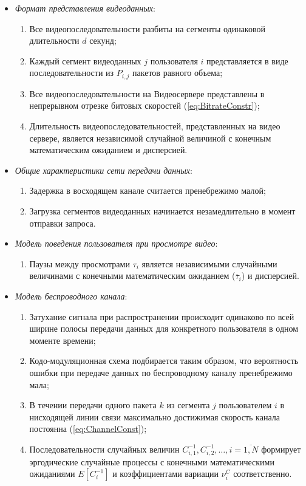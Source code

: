 \begin{itemize}
	\item \textit{Формат представления видеоданных}:
		\begin{enumerate}
			\item Все видеопоследовательности разбиты на сегменты одинаковой длительности $d$ секунд;
			\item Каждый сегмент видеоданных $j$ пользователя $i$ представляется в виде последовательности из $P_{i,j}$ пакетов равного объема;
			\item Все видеопоследовательности на Видеосервере представлены в непрерывном отрезке битовых скоростей (\ref{eq:BitrateConstr});
			\item Длительность видеопоследовательностей, представленных на видео сервере, является независимой случайной величиной с конечным математическим ожиданием и дисперсией.
		\end{enumerate}
	\item \textit{Общие характеристики сети передачи данных}:
		\begin{enumerate}
			\item Задержка в восходящем канале считается пренебрежимо малой;
			\item Загрузка сегментов видеоданных начинается незамедлительно в момент отправки запроса.
		\end{enumerate}
	\item \textit{Модель поведения пользователя при просмотре видео}:
		\begin{enumerate}
			\item Паузы между просмотрами $\tau_i$ является независимыми случайными величинами с конечными математическим ожиданием ($\overline{\tau}_i$) и дисперсией.
		\end{enumerate}
	\item \textit{Модель беспроводного канала}:
		\begin{enumerate}
			\item Затухание сигнала при распространении происходит одинаково по всей ширине полосы передачи данных для конкретного пользователя в одном моменте времени;
			\item Кодо-модуляционная схема подбирается таким образом, что вероятность ошибки при передаче данных по беспроводному каналу пренебрежимо мала;
			\item В течении передачи одного пакета $k$ из сегмента $j$ пользователем $i$ в нисходящей линии связи максимально достижимая скорость канала постоянна (\ref{eq:ChannelConst});
			\item Последовательности случайных величин $C^{-1}_{i,1}, C^{-1}_{i,2}, \ldots, i=\overline{1,N}$  формирует эргодические случайные процессы с конечными математическими ожиданиями $E[C_i^{-1}]$ и коэффициентами вариации $\nu^{C}_i$ соответственно.

\end{enumerate}
\end{itemize}
